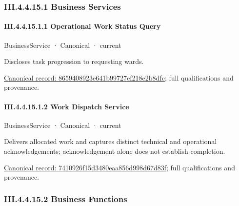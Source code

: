 \subsubsection*{III.4.4.15.1 Business Services}
\label{navigation:III.4.4.15.1}

\paragraph*{III.4.4.15.1.1 Operational Work Status Query}
\label{navigation:III.4.4.15.1.1}

\label{element:8659408923e641b99727ef218e2b8dfc}
{\small BusinessService · Canonical · current}\par

Discloses task progression to requesting wards.


{\footnotesize \href{../../../../continuum/business/business-service/8659408923e641b99727ef218e2b8dfc.md}{Canonical record: 8659408923e641b99727ef218e2b8dfc}; full qualifications and provenance.}\par
\paragraph*{III.4.4.15.1.2 Work Dispatch Service}
\label{navigation:III.4.4.15.1.2}

\label{element:7410926f15d3480eaa856d998d67d83f}
{\small BusinessService · Canonical · current}\par

Delivers allocated work and captures distinct technical and operational acknowledgements; acknowledgement alone does not establish completion.


{\footnotesize \href{../../../../continuum/business/business-service/7410926f15d3480eaa856d998d67d83f.md}{Canonical record: 7410926f15d3480eaa856d998d67d83f}; full qualifications and provenance.}\par
\subsubsection*{III.4.4.15.2 Business Functions}
\label{navigation:III.4.4.15.2}

